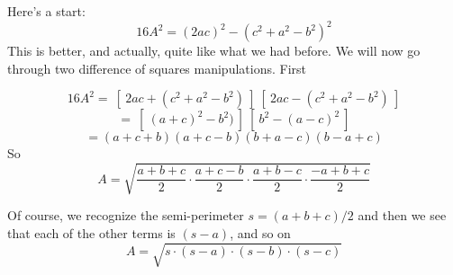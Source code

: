 \documentclass[11pt, oneside]{article}
\begin{document}
Here's a start:
\[ 16A^2 = (2ac)^2 - (c^2 + a^2-b^2)^2 \]
This is better, and actually, quite like what we had before.  We will now go through two difference of squares manipulations.  First

\[ 16A^2 = \ [ \ 2ac + (c^2 + a^2-b^2) \ ] \ [ \ 2ac - (c^2 + a^2-b^2) \ ]  \]
\[ = \ [ \ (a + c)^2 -b^2) \ ] \ [ \ b^2 - (a - c)^2 \ ]  \]
\[ =  (a + c + b)(a + c - b)(b + a - c)(b - a + c) \]
So
\[ A = \sqrt{\frac{a + b + c}{2}  \cdot \frac{a + c - b}{2}  \cdot \frac{a + b - c}{2}  \cdot \frac{-a + b + c}{2} } \]

Of course, we recognize the semi-perimeter $s = (a + b + c)/2$ and then we see that each of the other terms is $(s-a)$, and so on
\[ A = \sqrt{s \cdot (s - a) \cdot (s - b) \cdot (s - c) } \]
\end{document}
